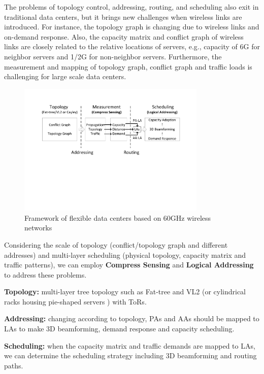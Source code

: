 \documentclass[journal,onecolumn,11pt]{IEEEtran}
\begin{document}
The problems of topology control, addressing, routing, and scheduling also exit in traditional data centers, but it brings new challenges when wireless links are introduced. For instance, the topology graph is changing due to wireless links and on-demand response. Also, the capacity matrix and conflict graph of wireless links are closely related to the relative locations of servers, e.g., capacity of 6G for neighbor servers and 1/2G for non-neighbor servers. Furthermore, the measurement and mapping of topology graph, conflict graph and traffic loads is challenging for large scale data centers.

\begin{figure}[!htp]
\centering
\includegraphics[width=0.8\textwidth]{framework.pdf}
\caption{Framework of flexible data centers based on 60GHz wireless networks}
\label{framework}
\end{figure}

Considering the scale of topology (conflict/topology graph and different addresses) and multi-layer scheduling (physical topology, capacity matrix and traffic patterns), we can employ \textbf{Compress Sensing} and \textbf{Logical Addressing} to address these problems.

\textbf{Topology:} multi-layer tree topology such as Fat-tree and VL2 (or cylindrical racks housing pie-shaped servers \cite{Shin:2012:FCW:2396556.2396560}) with ToRs.

\textbf{Addressing:} changing according to topology, PAs and AAs should be mapped to LAs to make 3D beamforming, demand response and capacity scheduling.

\textbf{Scheduling:} when the capacity matrix and traffic demands are mapped to LAs, we can determine the scheduling strategy including 3D beamforming and routing paths.
\end{document}
